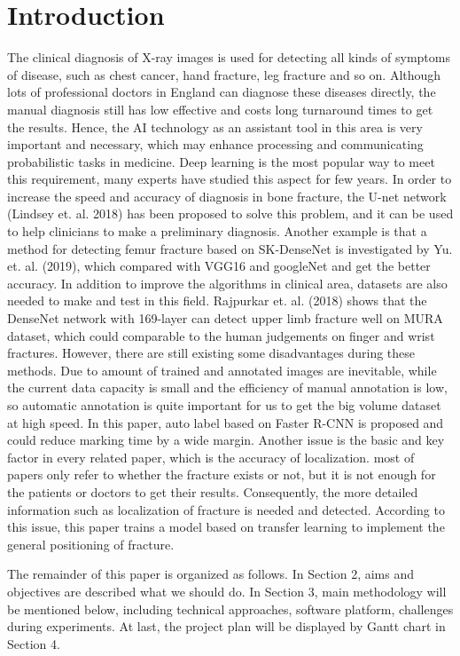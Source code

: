 \documentclass[12pt,oneside,a4paper]{article}
\begin{document}
\section{Introduction}
The clinical diagnosis of X-ray images is used for detecting all kinds of symptoms of disease, such as chest cancer, hand fracture, leg fracture and so on.  Although lots of professional doctors in England can diagnose these diseases directly, the manual diagnosis still has low effective and costs long turnaround times to get the results.  Hence, the AI technology as an assistant tool in this area is very important and necessary, which may enhance processing and communicating probabilistic tasks in medicine. Deep learning is the most popular way to meet this requirement, many experts have studied this aspect for few years. In order to increase the speed and accuracy of diagnosis in bone fracture, the U-net network (Lindsey et. al. 2018) has been proposed to solve this problem, and it can be used to help clinicians to make a preliminary diagnosis. Another example is that a method for detecting femur fracture based on SK-DenseNet is investigated by Yu. et. al. (2019), which compared with VGG16 and googleNet and get the better accuracy. In addition to improve the algorithms in clinical area, datasets are also needed to make and test in this field. Rajpurkar et. al. (2018) shows that the DenseNet network with 169-layer can detect upper limb fracture well on MURA dataset, which could comparable to the human judgements on finger and wrist fractures. However, there are still existing some disadvantages during these methods. Due to amount of trained and annotated images are inevitable, while the current data capacity is small and the efficiency of manual annotation is low, so automatic annotation is quite important for us to get the big volume dataset at high speed. In this paper, auto label based on Faster R-CNN is proposed and could reduce marking time by a wide margin. Another issue is the basic and key factor in every related paper, which is the accuracy of localization. most of papers only refer to whether the fracture exists or not, but it is not enough for the patients or doctors to get their results. Consequently, the more detailed information such as localization of fracture is needed and detected. According to this issue, this paper trains a model based on transfer learning to implement the general positioning of fracture.

The remainder of this paper is organized as follows. In Section 2, aims and objectives are described what we should do. In Section 3, main methodology will be mentioned below, including technical approaches, software platform, challenges during experiments. At last, the project plan will be displayed by Gantt chart in Section 4.
\end{document}
